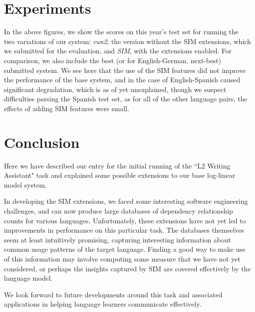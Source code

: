 \documentclass[11pt,a4paper]{article}
\begin{document}
\section{Experiments}
\label{sec:exp}

In the above figures, we show the scores on this year's test set for running
the two variations of our system: \emph{run2}, the version without the SIM
extensions, which we submitted for the evaluation, 
and \emph{SIM}, with the extensions
enabled. For comparison, we also include the best (or for English-German,
next-best) submitted system.
We see here that the use of the SIM features did not improve the performance of
the base system, and in the case of English-Spanish caused significant
degradation, which is as of yet unexplained, though we suspect difficulties
parsing the Spanish test set, as for all of the other language pairs, the
effects of adding SIM features were small.

\section{Conclusion} 
Here we have described our entry for the initial running of the ``L2 Writing
Assistant" task and explained some possible extensions to our base log-linear
model system.

In developing the SIM extensions, we faced some interesting software
engineering challenges, and can now produce large databases of dependency
relationship counts for various languages. Unfortunately, these extensions have
not yet led to improvements in performance on this particular task. The
databases themselves seem at least intuitively promising, capturing interesting
information about common usage patterns of the target language.
Finding a good way to make use of this information may involve computing some
measure that we have not yet considered, or perhaps the insights captured by
SIM are covered effectively by the language model.

We look forward to future developments around this task and associated
applications in helping language learners communicate effectively.

\clearpage


\end{document}
